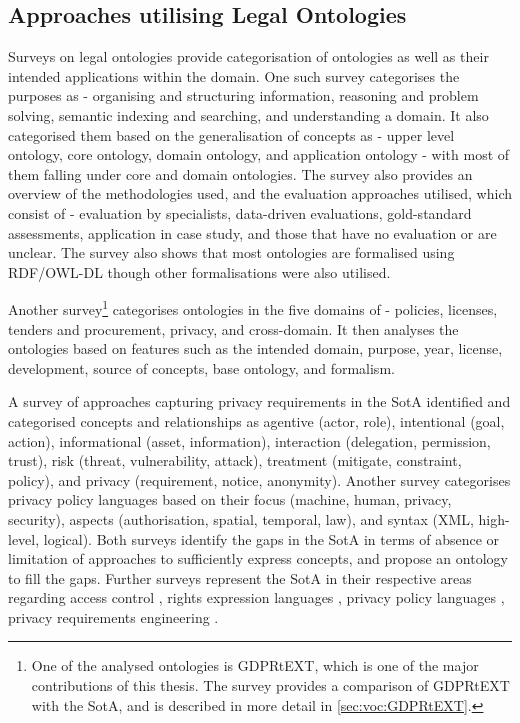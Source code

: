 

\subsection{Approaches utilising Legal Ontologies}
Surveys on legal ontologies provide categorisation of ontologies as well as their intended applications within the domain. One such survey \cite{rodrigues_legal_2019} categorises the purposes as - organising and structuring information, reasoning and problem solving, semantic indexing and searching, and understanding a domain. It also categorised them based on the generalisation of concepts as - upper level ontology, core ontology, domain ontology, and application ontology - with most of them falling under core and domain ontologies. The survey also provides an overview of the methodologies used, and the evaluation approaches utilised, which consist of - evaluation by specialists, data-driven evaluations, gold-standard assessments, application in case study, and those that have no evaluation or are unclear. The survey also shows that most ontologies are formalised using RDF/OWL-DL though other formalisations were also utilised.

Another survey\footnote{One of the analysed ontologies is GDPRtEXT, which is one of the major contributions of this thesis. The survey provides a comparison of GDPRtEXT with the SotA, and is described in more detail in \autoref{sec:voc:GDPRtEXT}.} \cite{leone_taking_2019} categorises ontologies in the five domains of - policies, licenses, tenders and procurement, privacy, and cross-domain. It then analyses the ontologies based on features such as the intended domain, purpose, year, license, development, source of concepts, base ontology, and formalism.

A survey of approaches capturing privacy requirements in the SotA \cite{gharib_towards_2017} identified and categorised concepts and relationships as agentive (actor, role), intentional (goal, action), informational (asset, information), interaction (delegation, permission, trust), risk (threat, vulnerability, attack), treatment (mitigate, constraint, policy), and privacy (requirement, notice, anonymity).
Another survey \cite{van_de_ven_qualitative_2016} categorises privacy policy languages based on their focus (machine, human, privacy, security), aspects (authorisation, spatial, temporal, law), and syntax (XML, high-level, logical).
Both surveys identify the gaps in the SotA in terms of absence or limitation of approaches to sufficiently express concepts, and propose an ontology to fill the gaps.
Further surveys represent the SotA in their respective areas regarding access control \cite{kirrane_access_2016}, rights expression languages \cite{pellegrini_genealogy_2018}, privacy policy languages \cite{van_de_ven_qualitative_2016}, privacy requirements engineering \cite{gharib_ontologies_2016}.

